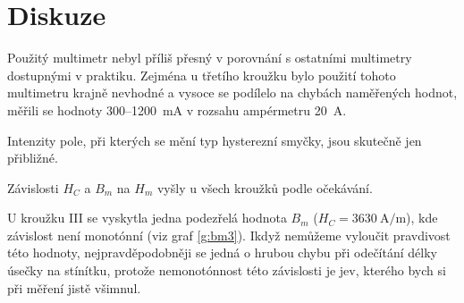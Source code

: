 \section*{Diskuze}
Použitý multimetr nebyl příliš přesný v porovnání s ostatními multimetry dostupnými v praktiku.
Zejména u třetího kroužku bylo použití tohoto multimetru krajně nevhodné a vysoce se podílelo na chybách naměřených hodnot, měřili se hodnoty 300--\SI{1200}{\milli\ampere} v rozsahu ampérmetru \SI{20}{\ampere}.

Intenzity pole, při kterých se mění typ hysterezní smyčky, jsou skutečně jen přibližné.

Závislosti $H_C$ a $B_m$ na $H_m$ vyšly u všech kroužků podle očekávání.

U kroužku III se vyskytla jedna podezřelá hodnota $B_m$ ($H_C=\SI{3630}{\ampere\per\metre}$), kde závislost není monotónní (viz graf \ref{g:bm3}).
Ikdyž nemůžeme vyloučit pravdivost této hodnoty, nejpravděpodobněji se jedná o hrubou chybu při odečítání délky úsečky na stínítku, protože nemonotónnost této závislosti je jev, kterého bych si při měření jistě všimnul.